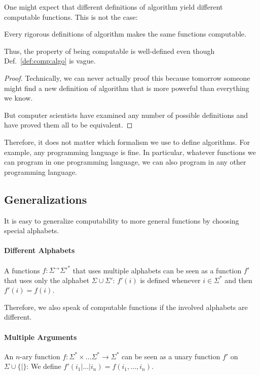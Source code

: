 One might expect that different definitions of algorithm yield different computable functions.
This is not the case:

\begin{theorem}
Every rigorous definitions of algorithm makes the same functions computable.

Thus, the property of being computable is well-defined even though Def.~\ref{def:comp:algo} is vague.
\end{theorem}
\begin{proof}
Technically, we can never actually proof this because tomorrow someone might find a new definition of algorithm that is more powerful than everything we know.

But computer scientists have examined any number of possible definitions and have proved them all to be equivalent.
\end{proof}

Therefore, it does not matter which formalism we use to define algorithms.
For example, any programming language is fine.
In particular, whatever functions we can program in one programming language, we can also program in any other programming language.

\subsection{Generalizations}\label{sec:comp:algo:gen}

It is easy to generalize computability to more general functions by choosing special alphabets.

\paragraph{Different Alphabets}
A functions $f:\Sigma^\to\Sigma'^*$ that uses multiple alphabets can be seen as a function $f'$ that uses only the alphabet $\Sigma\cup\Sigma'$:
$f'(i)$ is defined whenever $i\in\Sigma^*$ and then $f'(i)=f(i)$.

Therefore, we also speak of computable functions if the involved alphabets are different.

\paragraph{Multiple Arguments}
An $n$-ary function $f:\Sigma^*\times\ldots\Sigma^*\to\Sigma^*$ can be seen as a unary function $f'$ on $\Sigma\cup\{|\}$: We define $f'(i_1|\ldots|i_n)=f(i_1,\ldots,i_n)$.

